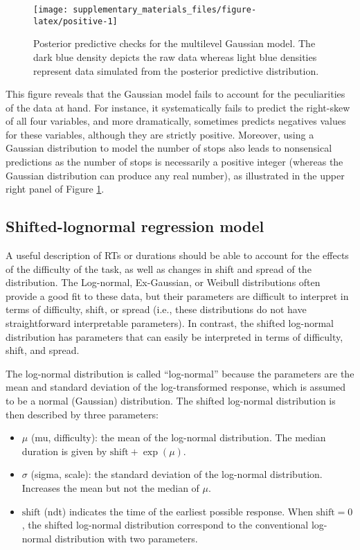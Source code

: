 \documentclass[
  11pt,
  english,
  ,doc,mask,floatsintext]{apa6}
\begin{document}
\begin{figure}[!htb]

{\centering \texttt{[image: supplementary\_materials\_files/figure-latex/positive-1]} 

}

\caption{Posterior predictive checks for the multilevel Gaussian model. The dark blue density depicts the raw data whereas light blue densities represent data simulated from the posterior predictive distribution.}\label{fig:positive}
\end{figure}

This figure reveals that the Gaussian model fails to account for the peculiarities of the data at hand. For instance, it systematically fails to predict the right-skew of all four variables, and more dramatically, sometimes predicts negatives values for these variables, although they are strictly positive. Moreover, using a Gaussian distribution to model the number of stops also leads to nonsensical predictions as the number of stops is necessarily a positive integer (whereas the Gaussian distribution can produce any real number), as illustrated in the upper right panel of Figure \ref{fig:positive}.

\hypertarget{shifted-lognormal-regression-model}{%
\subsection{Shifted-lognormal regression model}\label{shifted-lognormal-regression-model}}

A useful description of RTs or durations should be able to account for the effects of the difficulty of the task, as well as changes in shift and spread of the distribution. The Log-normal, Ex-Gaussian, or Weibull distributions often provide a good fit to these data, but their parameters are difficult to interpret in terms of difficulty, shift, or spread (i.e., these distributions do not have straightforward interpretable parameters). In contrast, the shifted log-normal distribution has parameters that can easily be interpreted in terms of difficulty, shift, and spread.

The log-normal distribution is called ``log-normal'' because the parameters are the mean and standard deviation of the log-transformed response, which is assumed to be a normal (Gaussian) distribution. The shifted log-normal distribution is then described by three parameters:

\begin{itemize}
\item
  \(\mu\) (mu, difficulty): the mean of the log-normal distribution. The median duration is given by \(\text{shift} + \exp (\mu)\).
\item
  \(\sigma\) (sigma, scale): the standard deviation of the log-normal distribution. Increases the mean but not the median of \(\mu\).
\item
  \(\text{shift}\) (ndt) indicates the time of the earliest possible response. When \(\text{shift} = 0\), the shifted log-normal distribution correspond to the conventional log-normal distribution with two parameters.
\end{itemize}
\end{document}
